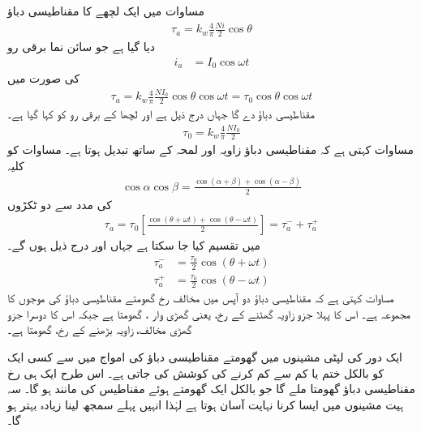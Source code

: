 مساوات   میں ایک لچھے کا مقناطیسی دباؤ
\begin{align}
\tau_a=k_w \frac{4}{\pi}\frac{Ni}{2} \cos \theta
\end{align}
دیا گیا ہے جو  سائن نما برقی رو
\begin{align}
i_a&=I_0 \cos \omega t
\end{align}
کی صورت میں
\begin{align}\label{مساوات_گھومتے_مشین_دباو_زاویہ_اور_وقت_پر_منحصر}
\tau_a=k_w \frac{4}{\pi} \frac{N I_0}{2} \cos \theta \cos \omega t=\tau_0 \cos \theta \cos \omega t
\end{align}
مقناطیسی دباؤ دے گا جہاں  درج ذیل ہے اور لچھا کے برقی رو کو  کہا گیا ہے۔
\begin{align}
\tau_0=k_w \frac{4}{\pi} \frac{N I_0}{2}
\end{align}
مساوات   کہتی ہے کہ  مقناطیسی دباؤ زاویہ  اور لمحہ  کے ساتھ تبدیل ہوتا ہے۔ مساوات  کو کلیہ 
\begin{align}\label{مساوات_گھومتے_مشین_کو_سائن_ٹکڑے}
\cos \alpha \cos \beta =\frac{\cos (\alpha +\beta) +\cos (\alpha -\beta)}{2}
\end{align}
کی مدد سے دو ٹکڑوں 
\begin{align}\label{مساوات_گھومتے_مشین_دو_مخالف_گھومتے_اجزاء}
\tau_a=\tau_0 \left [\frac{\cos (\theta +\omega t) +\cos (\theta -\omega t)}{2}\right]=\tau_a^{-}+\tau_a^{+}
\end{align}
میں تقسیم کیا جا سکتا ہے جہاں  اور  درج ذیل ہوں گے۔
\begin{align}
\tau_a^{-}&=\frac{\tau_0}{2} \cos (\theta +\omega t)\\
\tau_a^{+}&=\frac{\tau_0}{2} \cos (\theta -\omega t)
\end{align}
مساوات   کہتی ہے کہ  مقناطیسی دباؤ دو آپس میں مخالف رخ گھومتے  مقناطیسی دباؤ کی موجوں کا مجموعہ ہے۔ اس کا پہلا جزو  زاویہ  گھٹنے کے رخ،  یعنی گھڑی وار ، گھومتا ہے جبکہ اس کا دوسرا جزو  گھڑی مخالف، زاویہ بڑھنے کے رخ،  گھومتا ہے۔

ایک دور کی لپٹی مشینوں میں گھومتے مقناطیسی دباؤ کی امواج میں سے کسی ایک کو بالکل ختم یا کم سے کم کرنے کی کوشش کی جاتی ہے۔ اس طرح ایک ہی رخ  مقناطیسی دباؤ گھومتا ملے گا جو بالکل  ایک گھومتے ہوئے  مقناطیس کی مانند ہو گا۔ سہ ہیت  مشینوں میں ایسا کرنا نہایت آسان ہوتا ہے لہٰذا انہیں پہلے سمجھ لینا زیادہ بہتر ہو گا۔

